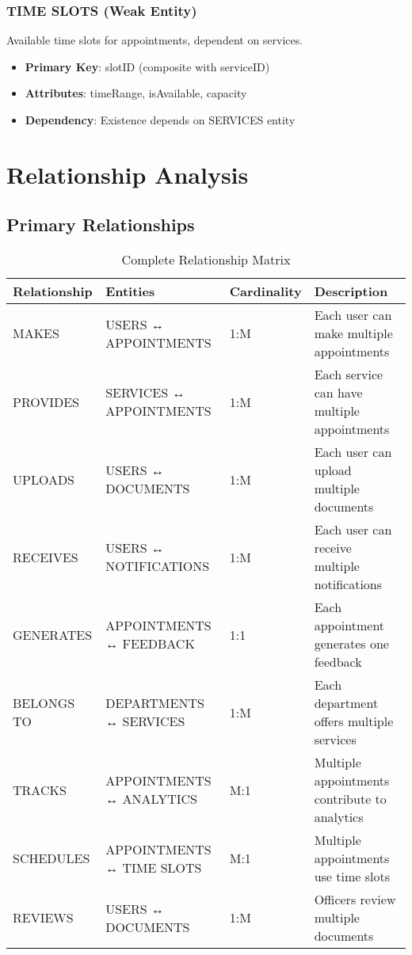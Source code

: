 \documentclass[12pt,a4paper]{article}
\begin{document}
\subsubsection{TIME SLOTS (Weak Entity)}
Available time slots for appointments, dependent on services.
\begin{itemize}[leftmargin=*]
    \item \textbf{Primary Key}: slotID (composite with serviceID)
    \item \textbf{Attributes}: timeRange, isAvailable, capacity
    \item \textbf{Dependency}: Existence depends on SERVICES entity
\end{itemize}

\newpage

\section{Relationship Analysis}

\subsection{Primary Relationships}

\begin{table}[h!]
\centering
\begin{tabularx}{\textwidth}{|X|X|X|X|}
\hline
\textbf{Relationship} & \textbf{Entities} & \textbf{Cardinality} & \textbf{Description} \\
\hline
MAKES & USERS ↔ APPOINTMENTS & 1:M & Each user can make multiple appointments \\
\hline
PROVIDES & SERVICES ↔ APPOINTMENTS & 1:M & Each service can have multiple appointments \\
\hline
UPLOADS & USERS ↔ DOCUMENTS & 1:M & Each user can upload multiple documents \\
\hline
RECEIVES & USERS ↔ NOTIFICATIONS & 1:M & Each user can receive multiple notifications \\
\hline
GENERATES & APPOINTMENTS ↔ FEEDBACK & 1:1 & Each appointment generates one feedback \\
\hline
BELONGS TO & DEPARTMENTS ↔ SERVICES & 1:M & Each department offers multiple services \\
\hline
TRACKS & APPOINTMENTS ↔ ANALYTICS & M:1 & Multiple appointments contribute to analytics \\
\hline
SCHEDULES & APPOINTMENTS ↔ TIME SLOTS & M:1 & Multiple appointments use time slots \\
\hline
REVIEWS & USERS ↔ DOCUMENTS & 1:M & Officers review multiple documents \\
\hline
\end{tabularx}
\caption{Complete Relationship Matrix}
\label{tab:relationships}
\end{table}
\end{document}
